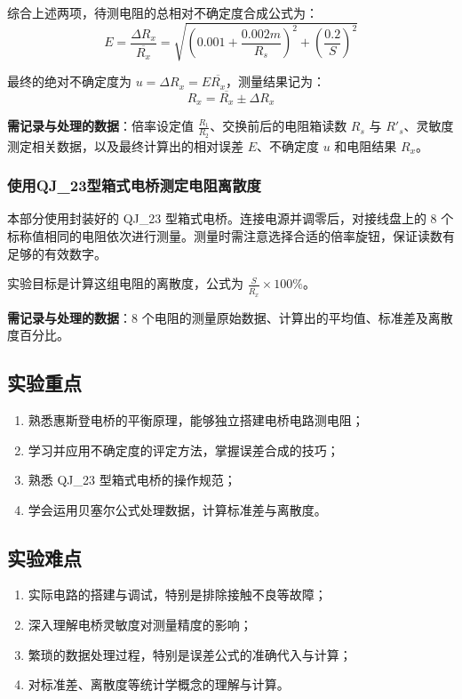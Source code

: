 \documentclass{../template/Report}%
\begin{document}
综合上述两项，待测电阻的总相对不确定度合成公式为：
\[E = \frac{\Delta R_x}{\overline{R_x}} = \sqrt{\left(0.001+ \frac{0.002m}{R_s}\right)^2 + \left(\frac{0.2}{S}\right)^2}\]

最终的绝对不确定度为 $u = \Delta R_x = E \overline{R_x}$，测量结果记为：
\[R_x = \overline{R_x} \pm \Delta R_x\]

\textbf{需记录与处理的数据}：倍率设定值 $\frac{R_1}{R_2}$、交换前后的电阻箱读数 $R_s$ 与 $R'_s$、灵敏度测定相关数据，以及最终计算出的相对误差 $E$、不确定度 $u$ 和电阻结果 $R_x$。

\subsubsection{使用QJ\_23型箱式电桥测定电阻离散度}
本部分使用封装好的 QJ\_23 型箱式电桥。连接电源并调零后，对接线盘上的 8 个标称值相同的电阻依次进行测量。测量时需注意选择合适的倍率旋钮，保证读数有足够的有效数字。

实验目标是计算这组电阻的离散度，公式为 $\frac{S}{\overline{R_x}} \times 100\%$。

\textbf{需记录与处理的数据}：8 个电阻的测量原始数据、计算出的平均值、标准差及离散度百分比。

\subsection{实验重点}
\begin{enumerate}
    \item 熟悉惠斯登电桥的平衡原理，能够独立搭建电桥电路测电阻；
    \item 学习并应用不确定度的评定方法，掌握误差合成的技巧；
    \item 熟悉 QJ\_23 型箱式电桥的操作规范；
    \item 学会运用贝塞尔公式处理数据，计算标准差与离散度。
\end{enumerate}

\subsection{实验难点}
\begin{enumerate}
    \item 实际电路的搭建与调试，特别是排除接触不良等故障；
    \item 深入理解电桥灵敏度对测量精度的影响；
    \item 繁琐的数据处理过程，特别是误差公式的准确代入与计算；
    \item 对标准差、离散度等统计学概念的理解与计算。
\end{enumerate}
\end{document}

